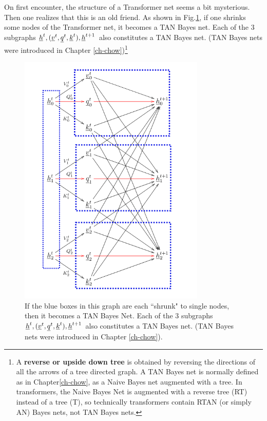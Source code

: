 On first encounter, the structure of a Transformer net
seems a bit mysterious. Then one realizes that this is
an old friend. As shown in Fig.\ref{fig-transformer-TAN-Bayes}, if one 
shrinks some nodes
of the Transformer net, it becomes a TAN Bayes net. Each of the 3 subgraphs ${\underline{h}}^t, ({\underline{v}}^t, {\underline{q}}^t, {\underline{k}}^t), {\underline{h}}^{t+1} $
also constitutes a TAN Bayes net. (TAN Bayes nets
were introduced in Chapter \ref{ch-chow})\footnote{A {\bf reverse or upside down tree} is obtained by reversing the directions of all the arrows of a tree directed graph. A TAN Bayes net is normally defined as in Chapter\ref{ch-chow}, as a Naive Bayes net augmented with a tree. In transformers, the Naive Bayes Net is augmented with a reverse tree (RT) instead of a tree (T), so technically transformers contain RTAN (or simply AN) Bayes nets, not TAN Bayes nets. }

\begin{figure}[h!]
\centering
\includegraphics[width=3.5in]
{transformer/transformer-TAN-Bayes.png}
\caption{If the blue boxes in this graph are each ``shrunk" to single nodes,
then it becomes a TAN Bayes Net. Each of the 3 subgraphs ${\underline{h}}^t, ({\underline{v}}^t, {\underline{q}}^t, {\underline{k}}^t), {\underline{h}}^{t+1} $
also constitutes a TAN Bayes net. (TAN Bayes nets
were introduced in Chapter \ref{ch-chow}).}
\label{fig-transformer-TAN-Bayes}
\end{figure}


